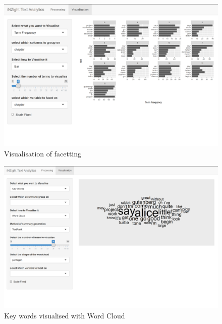 \documentclass[11pt, a4paper, oneside]{report}
\begin{document}
\begin{figure}
\centering
\includegraphics[scale=0.4]{visualisation-facetting.png}
\caption{Visualisation of facetting\label{fig:visualisation-facetting}}
\end{figure}

\begin{figure}
\centering
\includegraphics[scale=0.4]{visualisation-keywords-wordcloud.png}
\caption{Key words visualised with Word Cloud\label{fig:visualisation-keywords-wordcloud}}
\end{figure}
\end{document}
